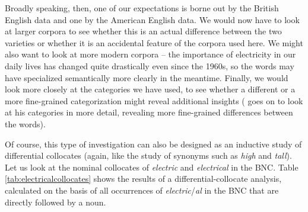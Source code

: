 Broadly speaking, then, one of our expectations is borne out by the British English data and one by the American English data. We would now have to look at larger corpora to see whether this is an actual difference between the two varieties or whether it is an accidental feature of the corpora used here. We might also want to look at more modern corpora -- the importance of electricity in our daily lives has changed quite drastically even since the 1960s, so the words may have specialized semantically more clearly in the meantime. Finally, we would look more closely at the categories we have used, to see whether a different or a more fine-grained categorization might reveal additional insights (\citet{kaunisto_electric/electrical_1999} goes on to look at his categories in more detail, revealing more fine-grained differences between the words).

Of course, this type of investigation can also be designed as an inductive study of differential collocates (again, like the study of synonyms such as \textit{high} and \textit{tall}). Let us look at the nominal collocates of \textit{electric} and \textit{electrical} in the BNC. Table \ref{tab:electricalcollocates} shows the results of a differential-collocate analysis, calculated on the basis of all occurrences of \textit{electric}/\textit{al} in the BNC that are directly followed by a noun.

